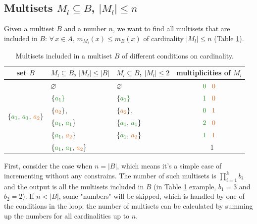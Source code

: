 \documentclass[12pt]{article}
\begin{document}
\subsection{Multisets $M_l \subseteq B$, $|M_l| \leqslant n$}

Given a multiset $B$ and a number $n$, we want to find all multisets that are included in $B$: $\forall \, x \in A, \, m_{M_l}(x) \leqslant m_B(x)$ of cardinality $|M_l| \leqslant n$ (Table \ref{tab:ex2}). \\

\begin{table}
  \centering
  \begin{tabular}{| c | l | l | c |}
    \hline
    \rowcolor{bg} 
      set $B$ & $M_l \subseteq B$, $|M_l| \leqslant |B|$ & 
                $M_l \subseteq B$, $|M_l| \leqslant 2$   & 
                multiplicities of $M_l$                                       \\
    \hline
    \multirow{6}{*}{$\{{\color{c1} a_1}, \, {\color{c1} a_1}, \, 
                       {\color{c2} a_2}\}$} 
    & $\varnothing$ & $\varnothing$ & ${\color{c1}0} \;\;\; {\color{c2}0}$    \\         & $\{\color{c1}a_1\}$ & $\{\color{c1}a_1\}$ 
    & ${\color{c1}1} \;\;\; {\color{c2}0}$                                    \\ 
    & $\{{\color{c2}a_2}\}$, & $\{{\color{c2}a_2}\}$, 
    & ${\color{c1}0} \;\;\; {\color{c2}1}$                                    \\ 
    & $\{{\color{c1}a_1}, \, {\color{c1}a_1}\}$  
    & $\{{\color{c1}a_1}, \, {\color{c1}a_1}\}$  
    & ${\color{c1}2} \;\;\; {\color{c2}0}$                                    \\           & $\{{\color{c1}a_1}, \, {\color{c2}a_2}\}$  
    & $\{{\color{c1}a_1}, \, {\color{c2}a_2}\}$ 
    & ${\color{c1} 1} \;\;\; {\color{c2} 1}$                                  \\  
    \cline{3-4}          
    & $\{{\color{c1}a_1}, \, {\color{c1}a_1}, \, {\color{c2}a_2}\}$ 
    & \cellcolor{Gainsboro} 
    & \cellcolor{Gainsboro}{\color{c1}2}$\;\;\;${\color{c2}1}                 \\
    \hline    
  \end{tabular}
  \caption{Multisets included in a multiset $B$ of different conditions on cardinality.}
  \label{tab:ex2}
\end{table}  

First, consider the case when $n = |B|$, which means it's a simple case of incrementing without any constrains. The number of such multisets is $\prod_{i = 1}^k b_i$ and the output is all the multisets included in $B$ (in Table \ref{tab:ex2} example, $b_1 = 3$ and $b_2 = 2$). If $n < |B|$, some "numbers" will be skipped, which is handled by one of the conditions in the loop; the number of multisets can be calculated by summing up the numbers for all cardinalities up to $n$. 
      
\end{document}
